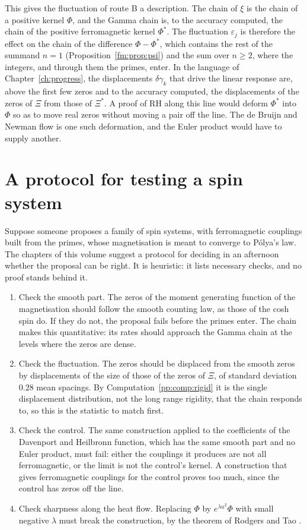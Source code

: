 This gives the fluctuation of route B a description. The chain of $\xi$ is the chain of a positive kernel $\Phi$, and the Gamma chain is, to the accuracy computed, the chain of the positive ferromagnetic kernel $\Phi^*$. The fluctuation $\varepsilon_j$ is therefore the effect on the chain of the difference $\Phi-\Phi^*$, which contains the rest of the summand $n=1$ (Proposition~\ref{fm:prop:psi}) and the sum over $n\ge2$, where the integers, and through them the primes, enter. In the language of Chapter~\ref{ch:progress}, the displacements $\delta\gamma_k$ that drive the linear response are, above the first few zeros and to the accuracy computed, the displacements of the zeros of $\Xi$ from those of $\Xi^*$. A proof of RH along this line would deform $\Phi^*$ into $\Phi$ so as to move real zeros without moving a pair off the line. The de Bruijn and Newman flow is one such deformation, and the Euler product would have to supply another.



\section{A protocol for testing a spin system}

Suppose someone proposes a family of spin systems, with ferromagnetic couplings built from the primes, whose magnetisation is meant to converge to P\'olya's law. The chapters of this volume suggest a protocol for deciding in an afternoon whether the proposal can be right. It is heuristic: it lists necessary checks, and no proof stands behind it.

\begin{enumerate}
\item Check the smooth part. The zeros of the moment generating function of the magnetisation should follow the smooth counting law, as those of the cosh spin do. If they do not, the proposal fails before the primes enter. The chain makes this quantitative: its rates should approach the Gamma chain at the levels where the zeros are dense.
\item Check the fluctuation. The zeros should be displaced from the smooth zeros by displacements of the size of those of the zeros of $\Xi$, of standard deviation $0.28$ mean spacings. By Computation~\ref{pp:comp:rigid} it is the single displacement distribution, not the long range rigidity, that the chain responds to, so this is the statistic to match first.
\item Check the control. The same construction applied to the coefficients of the Davenport and Heilbronn function, which has the same smooth part and no Euler product, must fail: either the couplings it produces are not all ferromagnetic, or the limit is not the control's kernel. A construction that gives ferromagnetic couplings for the control proves too much, since the control has zeros off the line.
\item Check sharpness along the heat flow. Replacing $\Phi$ by $e^{\lambda u^2}\Phi$ with small negative $\lambda$ must break the construction, by the theorem of Rodgers and Tao \cite{RodgersTao}.
\end{enumerate}

